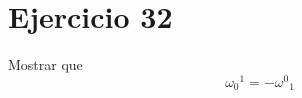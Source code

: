 \section*{Ejercicio 32}
Mostrar que 
\begin{equation*}
    {{\omega_0}^1} = - {\omega^0}_1
\end{equation*}